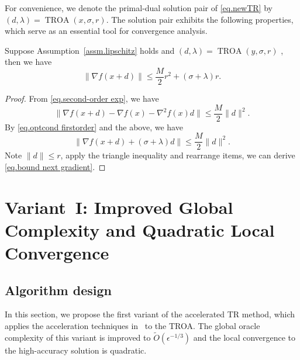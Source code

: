 \documentclass{mcom-l}
\numberwithin{equation}{section}
\begin{document}
For convenience, we denote the primal-dual solution pair of \eqref{eq.newTR} by $(d,\lambda) = \operatorname{TROA}(x, \sigma, r)$. The solution pair exhibits the following properties, which serve as an essential tool for convergence analysis.
\begin{lemma}
    \label{lem.bound next gradient}
    Suppose Assumption~\ref{assm.lipschitz} holds and $(d,\lambda)= \operatorname{TROA}(y,\sigma,r)$ , then we have
    \begin{equation}
        \label{eq.bound next gradient}
        \|\nabla f(x+d)\| \leq \frac{M}{2}r^2+(\sigma+\lambda)r.
    \end{equation}
\end{lemma}
\begin{proof}
    From \eqref{eq.second-order exp}, we have
    \begin{equation*}
        \|\nabla f(x+d)- \nabla f(x) -\nabla ^2 f(x) d\| \leq \frac{M}{2}\|d\|^2.
    \end{equation*}
    By \eqref{eq.optcond firstorder} and the above, we have
    \begin{equation*}
        \|\nabla f(x+d)+(\sigma+\lambda) d\| \leq \frac{M}{2}\|d\|^2.
    \end{equation*}
    Note $\|d\|\leq r$, apply the triangle inequality and rearrange items, we can derive \eqref{eq.bound next gradient}.
\end{proof}

\section{Variant~I: Improved Global Complexity and Quadratic Local Convergence}\label{sec.first variant}
\subsection{Algorithm design}
In this section, we propose the first variant of the accelerated TR method, which applies the acceleration techniques in~\cite{nesterov2008accelerating} to the TROA. The global oracle complexity of this variant is improved to $\tilde O(\epsilon^{-1/3})$ and the local convergence to the high-accuracy solution is quadratic.
\end{document}
